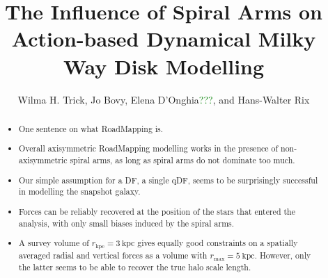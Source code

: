 \documentclass[iop,revtex4,numberedappendix,appendixfloats]{emulateapj}
\newcommand{\HW}[1]{\textcolor{Green}{#1}}
\begin{document}
\title{The Influence of Spiral Arms on Action-based Dynamical Milky Way Disk Modelling\\}

\author{Wilma H. Trick, Jo Bovy, Elena D'Onghia\HW{???}, and Hans-Walter Rix}



\begin{abstract}
\begin{itemize}
\item One sentence on what RoadMapping is.
\item Overall axisymmetric RoadMapping modelling works in the presence of non-axisymmetric spiral arms, as long as spiral arms do not dominate too much.
\item Our simple assumption for a DF, a single qDF, seems to be surprisingly successful in modelling the snapshot galaxy.
\item Forces can be reliably recovered at the position of the stars that entered the analysis, with only small biases induced by the spiral arms.
\item A survey volume of $r_\text{kpc}=3~\text{kpc}$ gives equally good constraints on a spatially averaged radial and vertical forces as a volume with $r_\text{max}=5~\text{kpc}$. However, only the latter seems to be able to recover the true halo scale length. 
\end{itemize}
\end{abstract}
\end{document}
